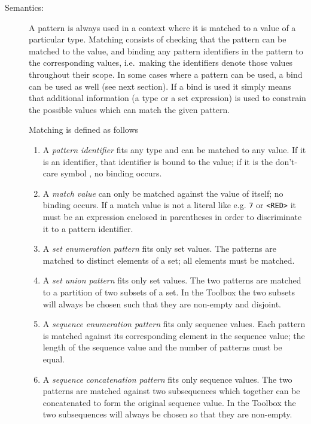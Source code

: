 \documentclass[\pformat,12pt]{article}
\begin{document}
\begin{description}
\item[Semantics:] A pattern is always used in a context where it is matched
  to a value of a particular type. Matching consists of checking that the
  pattern can be matched to the value, and binding any pattern identifiers
  in the pattern to the corresponding values, i.e.\ making the identifiers
  denote those values throughout their scope. In some cases where a pattern
  can be used, a bind can be used as well (see next section). If a bind is
  used it simply means that additional information (a type or a set
  expression) is used to constrain the possible values which can match the
  given pattern.

  Matching is defined as follows
  \begin{enumerate}
  \item A {\it pattern identifier} fits any type and can be matched to any
    value. If it is an identifier, that identifier is bound to the value;
    if it is the don't-care symbol \Lit{-}, no binding occurs.

  \item A {\it match value} can only be matched against the value of
    itself; no binding occurs. If a match value is not a literal like e.g.
    {\tt 7} or {\tt <RED>} it must be an expression enclosed in parentheses in order to
    discriminate it to a pattern identifier.

  \item A {\it set enumeration pattern} fits only set values. The patterns
    are matched to distinct elements of a set; all elements must be
    matched.

  \item A {\it set union pattern} fits only set values. The two patterns
    are matched to a partition of two subsets of a set. In the Toolbox
    the two subsets will always be chosen such that they are non-empty
    and disjoint.

  \item A {\it sequence enumeration pattern} fits only sequence values.
    Each pattern is matched against its corresponding element in the
    sequence value; the length of the sequence value and the number of
    patterns must be equal.

  \item A {\it sequence concatenation pattern} fits only sequence values.
    The two patterns are matched against two subsequences which together
    can be concatenated to form the original sequence value. In the
    Toolbox the two subsequences will always be chosen so that they
    are non-empty.


\end{enumerate}
\end{description}
\end{document}
